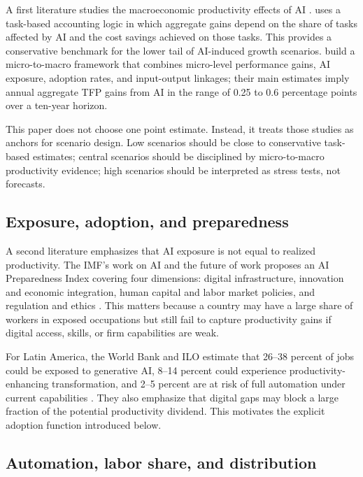 \documentclass[11pt,a4paper]{article}
\begin{document}
A first literature studies the macroeconomic productivity effects of AI \citep{oecd2024impactai}. \citet{acemoglu2024simple} uses a task-based accounting logic in which aggregate gains depend on the share of tasks affected by AI and the cost savings achieved on those tasks. This provides a conservative benchmark for the lower tail of AI-induced growth scenarios. \citet{filippucci2024miracle} build a micro-to-macro framework that combines micro-level performance gains, AI exposure, adoption rates, and input-output linkages; their main estimates imply annual aggregate TFP gains from AI in the range of 0.25 to 0.6 percentage points over a ten-year horizon.

This paper does not choose one point estimate. Instead, it treats those studies as anchors for scenario design. Low scenarios should be close to conservative task-based estimates; central scenarios should be disciplined by micro-to-macro productivity evidence; high scenarios should be interpreted as stress tests, not forecasts.

\subsection{Exposure, adoption, and preparedness}

A second literature emphasizes that AI exposure is not equal to realized productivity. The IMF's work on AI and the future of work proposes an AI Preparedness Index covering four dimensions: digital infrastructure, innovation and economic integration, human capital and labor market policies, and regulation and ethics \citep{cazzaniga2024genai}. This matters because a country may have a large share of workers in exposed occupations but still fail to capture productivity gains if digital access, skills, or firm capabilities are weak.

For Latin America, the World Bank and ILO estimate that 26--38 percent of jobs could be exposed to generative AI, 8--14 percent could experience productivity-enhancing transformation, and 2--5 percent are at risk of full automation under current capabilities \citep{worldbankilo2024lacgenai}. They also emphasize that digital gaps may block a large fraction of the potential productivity dividend. This motivates the explicit adoption function introduced below.

\subsection{Automation, labor share, and distribution}
\end{document}
